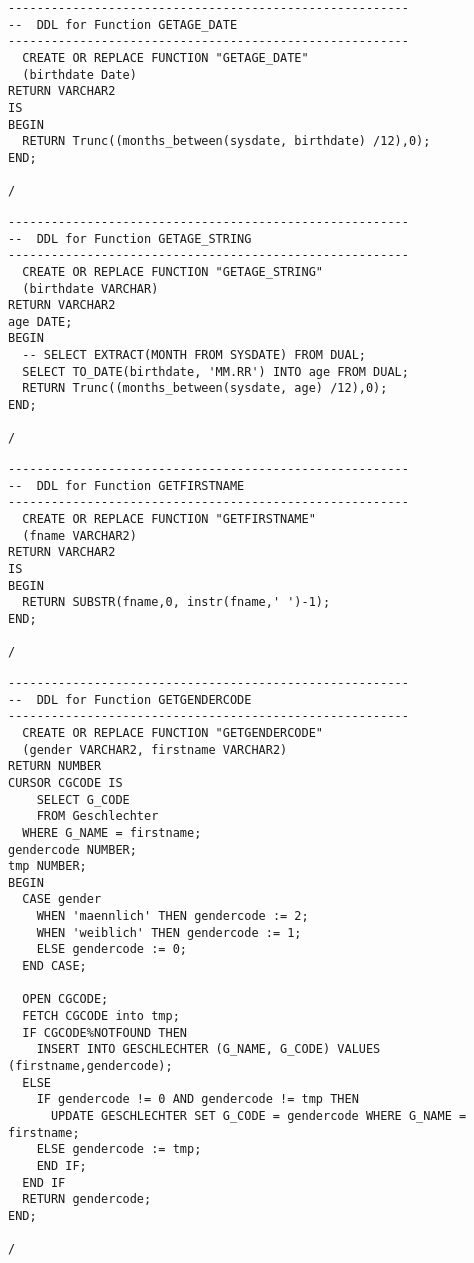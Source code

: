 \documentclass{scrartcl}
\begin{document}
\begin{lstlisting}
--------------------------------------------------------
--  DDL for Function GETAGE_DATE
--------------------------------------------------------
  CREATE OR REPLACE FUNCTION "GETAGE_DATE" 
  (birthdate Date)
RETURN VARCHAR2
IS
BEGIN
  RETURN Trunc((months_between(sysdate, birthdate) /12),0);
END;

/
\end{lstlisting}

\begin{lstlisting}
--------------------------------------------------------
--  DDL for Function GETAGE_STRING
--------------------------------------------------------
  CREATE OR REPLACE FUNCTION "GETAGE_STRING" 
  (birthdate VARCHAR)
RETURN VARCHAR2
age DATE;
BEGIN
  -- SELECT EXTRACT(MONTH FROM SYSDATE) FROM DUAL;
  SELECT TO_DATE(birthdate, 'MM.RR') INTO age FROM DUAL;
  RETURN Trunc((months_between(sysdate, age) /12),0);
END;

/
\end{lstlisting}

\begin{lstlisting}
--------------------------------------------------------
--  DDL for Function GETFIRSTNAME
--------------------------------------------------------
  CREATE OR REPLACE FUNCTION "GETFIRSTNAME" 
  (fname VARCHAR2)
RETURN VARCHAR2
IS
BEGIN
  RETURN SUBSTR(fname,0, instr(fname,' ')-1);
END;

/
\end{lstlisting}

\begin{lstlisting}
--------------------------------------------------------
--  DDL for Function GETGENDERCODE
--------------------------------------------------------
  CREATE OR REPLACE FUNCTION "GETGENDERCODE" 
  (gender VARCHAR2, firstname VARCHAR2)
RETURN NUMBER
CURSOR CGCODE IS
	SELECT G_CODE
	FROM Geschlechter
  WHERE G_NAME = firstname;
gendercode NUMBER;
tmp NUMBER;
BEGIN
  CASE gender
    WHEN 'maennlich' THEN gendercode := 2;
    WHEN 'weiblich' THEN gendercode := 1;
    ELSE gendercode := 0;
  END CASE;

  OPEN CGCODE;
  FETCH CGCODE into tmp;
  IF CGCODE%NOTFOUND THEN
    INSERT INTO GESCHLECHTER (G_NAME, G_CODE) VALUES (firstname,gendercode);
  ELSE 
    IF gendercode != 0 AND gendercode != tmp THEN
      UPDATE GESCHLECHTER SET G_CODE = gendercode WHERE G_NAME = firstname;
    ELSE gendercode := tmp;
    END IF;
  END IF
  RETURN gendercode;
END;

/
\end{lstlisting}
\end{document}
